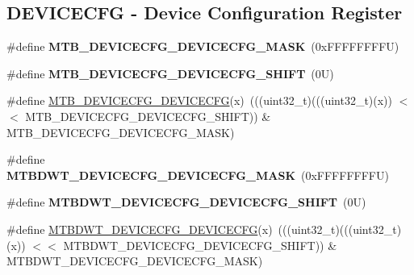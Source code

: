 \subsection*{D\+E\+V\+I\+C\+E\+C\+FG -\/ Device Configuration Register}
\begin{DoxyCompactItemize}
\item 
\mbox{\label{group___m_t_b___register___masks_ga5d8dec4596fd0f32f4b71f1fbfb71aee}} 
\#define {\bfseries M\+T\+B\+\_\+\+D\+E\+V\+I\+C\+E\+C\+F\+G\+\_\+\+D\+E\+V\+I\+C\+E\+C\+F\+G\+\_\+\+M\+A\+SK}~(0x\+F\+F\+F\+F\+F\+F\+F\+F\+U)
\item 
\mbox{\label{group___m_t_b___register___masks_gac42900c87a48c38d0b310cbeb8781c81}} 
\#define {\bfseries M\+T\+B\+\_\+\+D\+E\+V\+I\+C\+E\+C\+F\+G\+\_\+\+D\+E\+V\+I\+C\+E\+C\+F\+G\+\_\+\+S\+H\+I\+FT}~(0\+U)
\item 
\#define \mbox{\hyperlink{group___m_t_b___register___masks_gaa92591a7dc3aaa3c772d0ae4091130fb}{M\+T\+B\+\_\+\+D\+E\+V\+I\+C\+E\+C\+F\+G\+\_\+\+D\+E\+V\+I\+C\+E\+C\+FG}}(x)~(((uint32\+\_\+t)(((uint32\+\_\+t)(x)) $<$$<$ M\+T\+B\+\_\+\+D\+E\+V\+I\+C\+E\+C\+F\+G\+\_\+\+D\+E\+V\+I\+C\+E\+C\+F\+G\+\_\+\+S\+H\+I\+FT)) \& M\+T\+B\+\_\+\+D\+E\+V\+I\+C\+E\+C\+F\+G\+\_\+\+D\+E\+V\+I\+C\+E\+C\+F\+G\+\_\+\+M\+A\+SK)
\item 
\mbox{\label{group___m_t_b___register___masks_ga90daa5cb85d4d39b819f5c9bc1b20546}} 
\#define {\bfseries M\+T\+B\+D\+W\+T\+\_\+\+D\+E\+V\+I\+C\+E\+C\+F\+G\+\_\+\+D\+E\+V\+I\+C\+E\+C\+F\+G\+\_\+\+M\+A\+SK}~(0x\+F\+F\+F\+F\+F\+F\+F\+F\+U)
\item 
\mbox{\label{group___m_t_b___register___masks_ga2194cb4b21ad650bf3957d3f95f4dbbb}} 
\#define {\bfseries M\+T\+B\+D\+W\+T\+\_\+\+D\+E\+V\+I\+C\+E\+C\+F\+G\+\_\+\+D\+E\+V\+I\+C\+E\+C\+F\+G\+\_\+\+S\+H\+I\+FT}~(0\+U)
\item 
\#define \mbox{\hyperlink{group___m_t_b___register___masks_ga9d21c0abbf05163f867fd5f822a182bf}{M\+T\+B\+D\+W\+T\+\_\+\+D\+E\+V\+I\+C\+E\+C\+F\+G\+\_\+\+D\+E\+V\+I\+C\+E\+C\+FG}}(x)~(((uint32\+\_\+t)(((uint32\+\_\+t)(x)) $<$$<$ M\+T\+B\+D\+W\+T\+\_\+\+D\+E\+V\+I\+C\+E\+C\+F\+G\+\_\+\+D\+E\+V\+I\+C\+E\+C\+F\+G\+\_\+\+S\+H\+I\+FT)) \& M\+T\+B\+D\+W\+T\+\_\+\+D\+E\+V\+I\+C\+E\+C\+F\+G\+\_\+\+D\+E\+V\+I\+C\+E\+C\+F\+G\+\_\+\+M\+A\+SK)
\end{DoxyCompactItemize}
